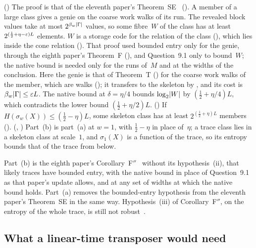 \begin{outline}
() The proof is that of the eleventh paper's Theorem~SE~\cite[Theorem~4.13]{MergeDepth2026}
(). A member of a large class gives a genie on the coarse work walks of its run. The revealed
block values take at most $2^{\beta_w\lvert \Gamma \rvert}$ values, so some fibre~$W$ of the class has at least
$2^{(\frac12+\eta-\varepsilon)L}$ elements. $W$ is a storage code for the relation of the class
(), which lies inside the cone relation
(). That proof used bounded entry only for the genie, through the eighth paper's
Theorem~F (), and Question~9.1 only to bound~$W$; the native bound is needed only for the runs
of~$M$ and at the widths of the conclusion. Here the genie is that of Theorem~T
() for the coarse work walks of the member, which are walks (); it transfers to the
skeleton by , and its cost is $\beta_w\lvert \Gamma \rvert\le\varepsilon L$. The native bound at $\delta=\eta/4$
bounds $\log_2\lvert W \rvert$ by $(\frac12+\eta/4)L$, which contradicts the lower bound $(\frac12+\eta/2)L$. () If
$H(\sigma_w(X))\le(\frac12-\eta)L$, some skeleton class has at least $2^{(\frac12+\eta)L}$ members
(). (, ) Part~(b) is part~(a) at $w=1$,
with $\frac12-\eta$ in place of~$\eta$; a trace class lies in a skeleton class at scale~$1$, and $\sigma_1(X)$ is a function of
the trace, so its entropy bounds that of the trace from below.
\end{outline}

Part~(b) is the eighth paper's Corollary~F$''$~\cite[Corollary~6.4]{EighthPaper2026} without its hypothesis~(ii), that likely
traces have bounded entry, with the native bound in place of Question~9.1 as that paper's update allows, and at any set of
widths at which the native bound holds. Part~(a) removes the bounded-entry hypothesis from the eleventh paper's Theorem~SE in the same way. Hypothesis~(iii)
of Corollary~F$''$, on the entropy of the whole trace, is still not robust~\cite[Section~6.2]{EighthPaper2026}.

\subsection{What a linear-time transposer would need}\label{sec:cons-construction}

